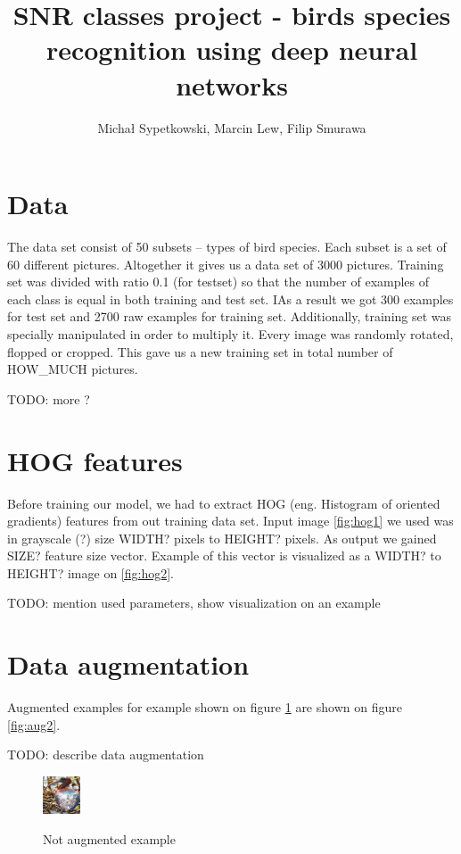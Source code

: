 \documentclass[a4paper]{article}
\begin{document}
\title{SNR classes project - birds species recognition using deep neural networks}

\author{Michał Sypetkowski, Marcin Lew, Filip Smurawa}
\maketitle

\section{Data}
The data set consist of 50 subsets – types of bird species. Each subset is a set of 60 different pictures. Altogether it gives us a data set of 3000 pictures.
Training set was divided with ratio 0.1 (for testset) so that the number of examples of each class is equal in both training and test set.
IAs a result we got 300 examples for test set and 2700 raw examples for training set.
Additionally, training set was specially manipulated in order to multiply it. Every image was randomly rotated, flopped or cropped. 
This gave us a new training set in total number of HOW_MUCH pictures.

TODO: more ?

\section{HOG features}
Before training our model, we had to extract HOG (eng. Histogram of oriented gradients) features from out training data set. 
Input image \ref{fig:hog1} we used was in grayscale (?) size WIDTH? pixels to HEIGHT? pixels. As output we gained SIZE? feature size vector. 
Example of this vector is visualized as a WIDTH? to HEIGHT? image on \ref{fig:hog2}.


TODO: mention used parameters, show visualization on an example


\section{Data augmentation}
Augmented examples for example shown on figure \ref{fig:aug1}
are shown on figure \ref{fig:aug2}.

TODO: describe data augmentation

\begin{figure}[h]
    \caption[]{Not augmented example}
    \centering
    \includegraphics[page=2,width=0.1\textwidth]{aug1.png}
    \label{fig:aug1}
\end{figure}
\end{document}
